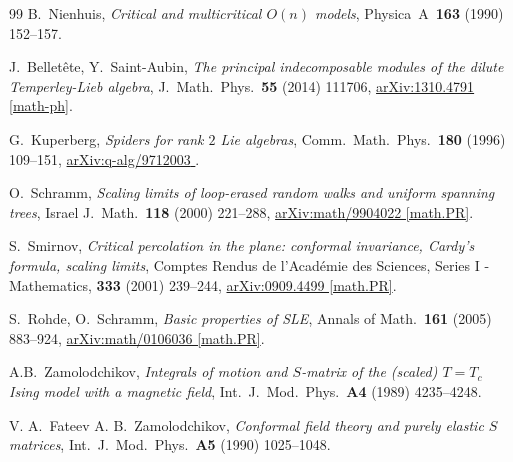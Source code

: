 \documentclass[11pt]{article}
\numberwithin{equation}{section}
\theoremstyle{plain}
\numberwithin{equation}{section}
\def\arxiv#1#2{\href{http://arxiv.org/abs/#1}{\textsf{arXiv:#1 #2}}}
\begin{document}
\begin{thebibliography}{99}
B.~Nienhuis,
{\em Critical and multicritical $O(n)$ models}, 
Physica~A~{\bf 163} (1990) 152--157.
	
J.~Bellet\^ete, Y.~Saint-Aubin,
{\em The principal indecomposable modules of the dilute Temperley-Lieb algebra},
J.~Math.~Phys.~{\bf 55} (2014) 111706,
\arxiv{1310.4791}{[math-ph]}.	
		
	G.~Kuperberg,
	{\em Spiders for rank $2$ Lie algebras},
	Comm.~Math.~Phys.~{\bf 180} (1996) 109--151,
	\arxiv{q-alg/9712003}{\!\!}.			

O.~Schramm, 
{\em Scaling limits of loop-erased random walks and uniform spanning trees}, 
Israel J.~Math.~{\bf 118} (2000) 221--288,
\arxiv{math/9904022}{[math.PR]}.

S.~Smirnov, 
{\em Critical percolation in the plane: conformal invariance, Cardy's formula, scaling limits}, 
Comptes Rendus de l'Acad\'emie des Sciences, Series I - Mathematics, 
{\bf 333} (2001) 239--244,
\arxiv{0909.4499}{[math.PR]}.

S.~Rohde, O.~Schramm, 
{\em Basic properties of SLE}, 
Annals of Math.~{\bf 161} (2005) 883--924,
\arxiv{math/0106036}{[math.PR]}.

A.B.~Zamolodchikov, 
{\em Integrals of motion and $S$-matrix of the (scaled) $T=T_c$ Ising model with a magnetic field}, 
Int.~J.~Mod.~Phys.~{\bf A4} (1989) 4235--4248.

V. A.~Fateev A. B.~Zamolodchikov, 
{\em Conformal field theory and purely elastic $S$ matrices}, 
Int.~J.~Mod.~Phys.~{\bf A5} (1990) 1025--1048.




\end{thebibliography}
\end{document}
